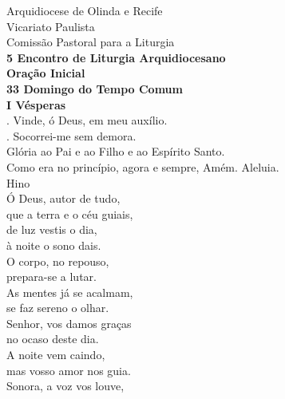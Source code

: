 \documentclass{book}
\begin{document}
\pagestyle{empty}
\begin{center}
    Arquidiocese de Olinda e Recife \\
    Vicariato Paulista \\
    Comissão Pastoral para a Liturgia
    \vspace{.2cm} \\
    \textcolor{VioletRed1}{\textbf{5\textordmasculine{} Encontro de Liturgia Arquidiocesano}}
    \vspace{.2cm} \\
    \textbf{Oração Inicial}
    \vspace{.2cm} \\
    \textbf{33\textordmasculine{} Domingo do Tempo Comum}
    \vspace{.2cm} \\
    \textbf{I Vésperas}
    \vspace{.2cm} \\
    {\color{VioletRed1} \Vbar.} Vinde, ó Deus, em meu auxílio. \\
    {\color{VioletRed1} \Rbar.} Socorrei-me sem demora. \\
    Glória ao Pai e ao Filho e ao Espírito Santo. \\
    Como era no princípio, agora e sempre, Amém. Aleluia.
    \vspace{.2cm} \\
    \textcolor{VioletRed1}{Hino}
    \vspace{.2cm} \\
    Ó Deus, autor de tudo, \\
    que a terra e o céu guiais, \\
    de luz vestis o dia, \\
    à noite o sono dais.
    \vspace{.2cm} \\
    O corpo, no repouso, \\
    prepara-se a lutar. \\
    As mentes já se acalmam, \\
    se faz sereno o olhar.
    \vspace{.2cm} \\
    Senhor, vos damos graças \\
    no ocaso deste dia. \\
    A noite vem caindo, \\
    mas vosso amor nos guia.
    \vspace{.2cm} \\
    Sonora, a voz vos louve, \\

\end{center}
\end{document}
